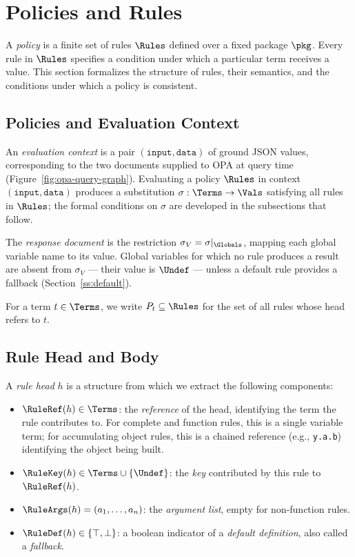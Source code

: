 \section{Policies and Rules}
\label{s:rules}

A \rego \emph{policy} is a finite set of rules $\Rules$ defined over a fixed package $\pkg$.
Every rule in $\Rules$ specifies a condition under which a particular term receives a value.
This section formalizes the structure of rules, their semantics, and the conditions under which a policy is consistent.

\subsection{Policies and Evaluation Context}
\label{ss:policy}


An \emph{evaluation context} is a pair $(\mathtt{input}, \mathtt{data})$ of ground JSON values, corresponding to the two documents supplied to OPA at query time (Figure~\ref{fig:opa-query-graph}).
Evaluating a policy $\Rules$ in context $(\mathtt{input}, \mathtt{data})$ produces a substitution $\sigma : \Terms \to \Vals$ satisfying all rules in $\Rules$; the formal conditions on $\sigma$ are developed in the subsections that follow.

The \emph{response document} is the restriction $\sigma_V = \sigma|_{\Globals}$, mapping each global variable name to its value.
Global variables for which no rule produces a result are absent from $\sigma_V$ — their value is $\Undef$ — unless a default rule provides a fallback (Section~\ref{ss:default}).

For a term $t \in \Terms$, we write $P_t \subseteq \Rules$ for the set of all rules whose head refers to $t$.


\subsection{Rule Head and Body}
\label{ss:head-body}


A \emph{rule head} $h$ is a structure from which we extract the following components:
\begin{itemize}
  \item $\RuleRef(h) \in \Terms$: the \emph{reference} of the head, identifying the term the rule contributes to.
    For complete and function rules, this is a single variable term; for accumulating object rules, this is a chained reference (e.g., \texttt{y.a.b}) identifying the object being built.
  \item $\RuleKey(h) \in \Terms \cup \{\Undef\}$: the \emph{key} contributed by this rule to $\RuleRef(h)$.
  \item $\RuleArgs(h) = (a_1, \ldots, a_n)$: the \emph{argument list}, empty for non-function rules.
  \item $\RuleDef(h) \in \{\top,\bot\}$: a boolean indicator of a \emph{default definition}, also called a \emph{fallback}.
\end{itemize}

